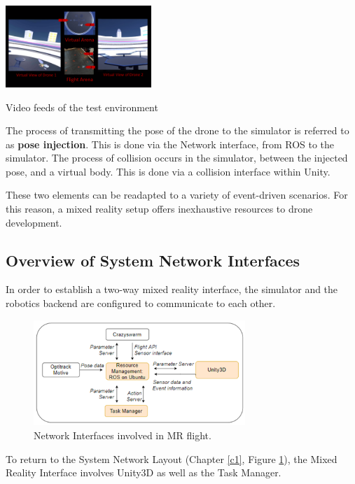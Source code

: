 \begin{marginfigure}%
    \raggedright
    \includegraphics[width=5.5cm]{images/xr_pres.png}
    \caption{Video feeds of the test environment}
    \label{fig:video_feed}
\end{marginfigure}

The process of transmitting the pose of the drone to the simulator is referred to as \textbf{pose injection}. This is done via the Network interface, from ROS to the simulator. The process of collision occurs in the simulator, between the injected pose, and a virtual body. This is done via a collision interface within Unity.

These two elements can be readapted to a variety of event-driven scenarios. For this reason, a mixed reality setup offers inexhaustive resources to drone development.

\subsection{Overview of System Network Interfaces}

In order to establish a two-way mixed reality interface, the simulator and the robotics backend are configured to communicate to each other. 

\begin{figure}[h]
    \raggedright
    
    \hspace{1cm}\includegraphics[width=8cm]{images/xr_system/xr_overview.png}
    \caption{Network Interfaces involved in MR flight.}
    \label{fig:network_reference}
\end{figure}

To return to the System Network Layout (Chapter \ref{c1}, Figure \ref{fig:network_reference}), the Mixed Reality Interface involves Unity3D as well as the Task Manager.



